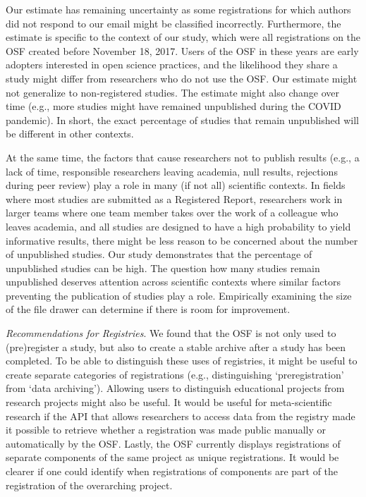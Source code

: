 \documentclass[
  ,jou, a4paper,floatsintext]{apa6}
\begin{document}
Our estimate has remaining uncertainty as some registrations for which authors did not respond to our email might be classified incorrectly. Furthermore, the estimate is specific to the context of our study, which were all registrations on the OSF created before November 18, 2017. Users of the OSF in these years are early adopters interested in open science practices, and the likelihood they share a study might differ from researchers who do not use the OSF. Our estimate might not generalize to non-registered studies. The estimate might also change over time (e.g., more studies might have remained unpublished during the COVID pandemic). In short, the exact percentage of studies that remain unpublished will be different in other contexts.

At the same time, the factors that cause researchers not to publish results (e.g., a lack of time, responsible researchers leaving academia, null results, rejections during peer review) play a role in many (if not all) scientific contexts. In fields where most studies are submitted as a Registered Report, researchers work in larger teams where one team member takes over the work of a colleague who leaves academia, and all studies are designed to have a high probability to yield informative results, there might be less reason to be concerned about the number of unpublished studies. Our study demonstrates that the percentage of unpublished studies can be high. The question how many studies remain unpublished deserves attention across scientific contexts where similar factors preventing the publication of studies play a role. Empirically examining the size of the file drawer can determine if there is room for improvement.

\emph{Recommendations for Registries}. We found that the OSF is not only used to (pre)register a study, but also to create a stable archive after a study has been completed. To be able to distinguish these uses of registries, it might be useful to create separate categories of registrations (e.g., distinguishing `preregistration' from `data archiving'). Allowing users to distinguish educational projects from research projects might also be useful. It would be useful for meta-scientific research if the API that allows researchers to access data from the registry made it possible to retrieve whether a registration was made public manually or automatically by the OSF. Lastly, the OSF currently displays registrations of separate components of the same project as unique registrations. It would be clearer if one could identify when registrations of components are part of the registration of the overarching project.
\end{document}
